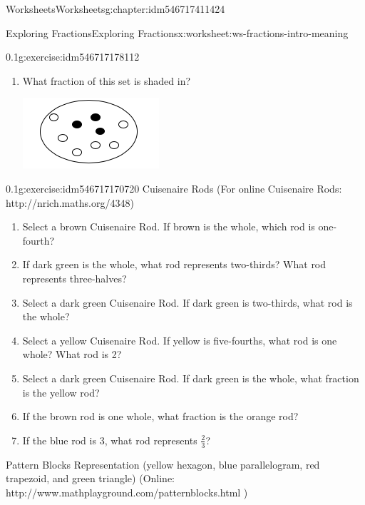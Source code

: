 \documentclass[twoside,11pt,]{book}
\begin{document}
\begin{chapterptx}{Worksheets}{}{Worksheets}{}{}{g:chapter:idm546717411424}
\begin{worksheet-section-numberless}{Exploring Fractions}{}{Exploring Fractions}{}{}{x:worksheet:ws-fractions-intro-meaning}
\begin{divisionexercise}{2}{}{0.1}{g:exercise:idm546717178112}
\begin{enumerate}[label=(\alph*)]
\item{}What fraction of this set is shaded in? \begin{sidebyside}{1}{0.35}{0.35}{0}%
\begin{sbspanel}{0.3}%
\includegraphics[width=1\linewidth]{images/counters-one-third.png}
\end{sbspanel}%
\end{sidebyside}%
%
\end{enumerate}
\end{divisionexercise}%
\clearpage
\begin{divisionexercise}{3}{}{0.1}{g:exercise:idm546717170720}%
Cuisenaire Rods (For online Cuisenaire Rods: http:\slash{}\slash{}nrich.maths.org\slash{}4348)%
%
\begin{enumerate}[label=(\alph*)]
\item{}Select a brown Cuisenaire Rod.  If brown is the whole, which rod is one-fourth?%
\item{}If dark green is the whole, what rod represents two-thirds? What rod represents three-halves?%
\item{}Select a dark green Cuisenaire Rod.  If dark green is two-thirds, what rod is the whole?%
\item{}Select a yellow Cuisenaire Rod.  If yellow is five-fourths, what rod is one whole? What rod is 2?%
\item{}Select a dark green Cuisenaire Rod.  If dark green is the whole, what fraction is the yellow rod?%
\item{}If the brown rod is one whole, what fraction is the orange rod?%
\item{}If the blue rod is 3, what rod represents \(\frac{2}{3} \)?%
\end{enumerate}
\end{divisionexercise}%
\begin{introduction}{}%
Pattern Blocks Representation (yellow hexagon, blue parallelogram, red trapezoid, and green triangle) (Online: http:\slash{}\slash{}www.mathplayground.com\slash{}patternblocks.html )%

\end{introduction}
\end{worksheet-section-numberless}
\end{chapterptx}
\end{document}
